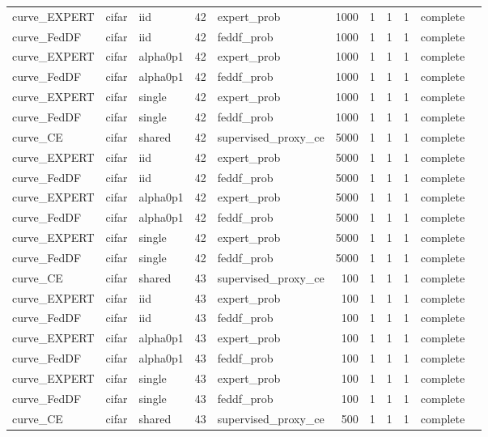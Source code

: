 \begin{tabular}{lllrlrrrrll}
curve\_EXPERT & cifar & iid & 42 & expert\_prob & 1000 & 1 & 1 & 1 & complete &  \\
curve\_FedDF & cifar & iid & 42 & feddf\_prob & 1000 & 1 & 1 & 1 & complete &  \\
curve\_EXPERT & cifar & alpha0p1 & 42 & expert\_prob & 1000 & 1 & 1 & 1 & complete &  \\
curve\_FedDF & cifar & alpha0p1 & 42 & feddf\_prob & 1000 & 1 & 1 & 1 & complete &  \\
curve\_EXPERT & cifar & single & 42 & expert\_prob & 1000 & 1 & 1 & 1 & complete &  \\
curve\_FedDF & cifar & single & 42 & feddf\_prob & 1000 & 1 & 1 & 1 & complete &  \\
curve\_CE & cifar & shared & 42 & supervised\_proxy\_ce & 5000 & 1 & 1 & 1 & complete &  \\
curve\_EXPERT & cifar & iid & 42 & expert\_prob & 5000 & 1 & 1 & 1 & complete &  \\
curve\_FedDF & cifar & iid & 42 & feddf\_prob & 5000 & 1 & 1 & 1 & complete &  \\
curve\_EXPERT & cifar & alpha0p1 & 42 & expert\_prob & 5000 & 1 & 1 & 1 & complete &  \\
curve\_FedDF & cifar & alpha0p1 & 42 & feddf\_prob & 5000 & 1 & 1 & 1 & complete &  \\
curve\_EXPERT & cifar & single & 42 & expert\_prob & 5000 & 1 & 1 & 1 & complete &  \\
curve\_FedDF & cifar & single & 42 & feddf\_prob & 5000 & 1 & 1 & 1 & complete &  \\
curve\_CE & cifar & shared & 43 & supervised\_proxy\_ce & 100 & 1 & 1 & 1 & complete &  \\
curve\_EXPERT & cifar & iid & 43 & expert\_prob & 100 & 1 & 1 & 1 & complete &  \\
curve\_FedDF & cifar & iid & 43 & feddf\_prob & 100 & 1 & 1 & 1 & complete &  \\
curve\_EXPERT & cifar & alpha0p1 & 43 & expert\_prob & 100 & 1 & 1 & 1 & complete &  \\
curve\_FedDF & cifar & alpha0p1 & 43 & feddf\_prob & 100 & 1 & 1 & 1 & complete &  \\
curve\_EXPERT & cifar & single & 43 & expert\_prob & 100 & 1 & 1 & 1 & complete &  \\
curve\_FedDF & cifar & single & 43 & feddf\_prob & 100 & 1 & 1 & 1 & complete &  \\
curve\_CE & cifar & shared & 43 & supervised\_proxy\_ce & 500 & 1 & 1 & 1 & complete &  \\

\end{tabular}
